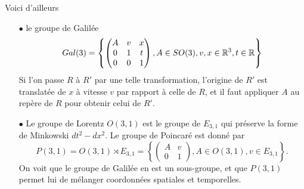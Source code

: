 Voici d'ailleurs
\begin{itemize}
\item[$\bullet$] le groupe de Galilée 
\[Gal(3)=\left\{\begin{pmatrix} A & v & x \\ 0 & 1 & t \\ 0 & 0 & 1 \end{pmatrix}, A\in SO(3), v,x\in \mathbb R^3,t\in \mathbb R\right\}\]
Si l'on passe $R$ à $R'$ par une telle transformation, l'origine de $R'$ est translatée de $x$ à vitesse $v$ par rapport à celle de $R$, et il faut appliquer $A$ au repère de $R$ pour obtenir celui de $R'$.
\item[$\bullet$] Le groupe de Lorentz $O(3,1)$ est le groupe de $E_{3,1}$ qui préserve la forme de Minkowski $dt^2-dx^2$. Le groupe de Poincaré est donné par
\[P(3,1)=O(3,1)\rtimes E_{3,1} =\left\{\begin{pmatrix} A & v \\ 0 & 1 \end{pmatrix}, A\in O(3,1),v\in E_{3,1}\right\}.\]
On voit que le groupe de Galilée en est un sous-groupe, et que $P(3,1)$ permet lui de mélanger coordonnées spatiales et temporelles. 
\end{itemize}


































